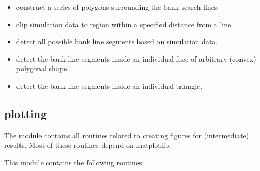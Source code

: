 \begin{itemize}
\item {} construct a series of polygons surrounding the bank search lines.
\item {} clip simulation data to region within a specified distance from a line.
\item {} detect all possible bank line segments based on simulation data.
\item {} detect the bank line segments inside an individual face of arbitrary (convex) polygonal shape.
\item {} detect the bank line segments inside an individual triangle.
\end{itemize}

\subsection{plotting }

The  module contains all routines related to creating figures for \dfastbe (intermediate) results.
Most of these routines depend on matplotlib.

This module contains the following routines:

